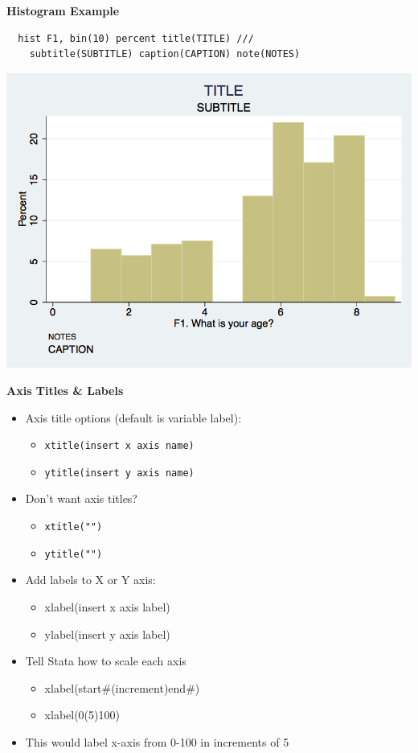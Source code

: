 \documentclass[]{book}
\providecommand{\tightlist}{%
  \setlength{\itemsep}{0pt}\setlength{\parskip}{0pt}}
\begin{document}
\textbf{Histogram Example}

\begin{verbatim}
  hist F1, bin(10) percent title(TITLE) ///
    subtitle(SUBTITLE) caption(CAPTION) note(NOTES)
\end{verbatim}

\includegraphics{Stata/StataModGraph/images/hist1.png}

\textbf{Axis Titles \& Labels}

\begin{itemize}
\tightlist
\item
  Axis title options (default is variable label):

  \begin{itemize}
  \tightlist
  \item
    \texttt{xtitle(insert\ x\ axis\ name)}
  \item
    \texttt{ytitle(insert\ y\ axis\ name)}
  \end{itemize}
\item
  Don't want axis titles?

  \begin{itemize}
  \tightlist
  \item
    \texttt{xtitle("")}
  \item
    \texttt{ytitle("")}
  \end{itemize}
\item
  Add labels to X or Y axis:

  \begin{itemize}
  \tightlist
  \item
    xlabel(insert x axis label)
  \item
    ylabel(insert y axis label)
  \end{itemize}
\item
  Tell Stata how to scale each axis

  \begin{itemize}
  \tightlist
  \item
    xlabel(start\#(increment)end\#)
  \item
    xlabel(0(5)100)
  \end{itemize}
\item
  This would label x-axis from 0-100 in increments of 5
\end{itemize}
\end{document}
